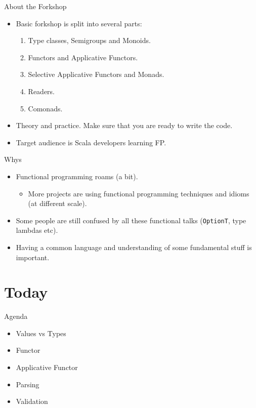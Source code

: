 \documentclass[presentation,aspectratio=169,smaller]{beamer}
\begin{document}
\begin{frame}[label={sec:org7c68a04}]{About the Forkshop}
\begin{itemize}
\item Basic forkshop is split into several parts:
\begin{enumerate}
\item Type classes, Semigroups and Monoids.
\item Functors and Applicative Functors.
\item Selective Applicative Functors and Monads.
\item Readers.
\item Comonads.
\end{enumerate}
\item Theory and practice. Make sure that you are ready to write the code.
\item Target audience is Scala developers learning FP.
\end{itemize}
\end{frame}

\begin{frame}[label={sec:org8dde678},fragile]{Whys}
 \begin{itemize}
\item <1-> Functional programming roams (a bit).
\begin{itemize}
\item More projects are using functional programming techniques and idioms (at
different scale).
\end{itemize}
\item <2-> Some people are still confused by all these functional talks (\texttt{OptionT}, type
lambdas etc).
\item <3-> Having a common language and understanding of some fundamental stuff is
important.
\end{itemize}
\end{frame}

\section*{Today}
\label{sec:orgc2c8a83}
\begin{frame}[label={sec:org82fa779}]{Agenda}
\begin{itemize}
\item Values vs Types
\item Functor
\item Applicative Functor
\item Parsing
\item Validation
\end{itemize}
\end{frame}
\end{document}
